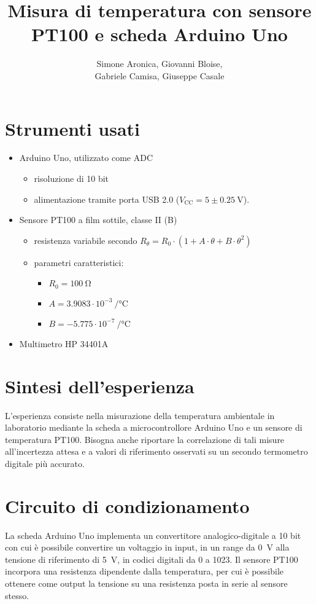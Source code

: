 \documentclass{article}
\title{Misura di temperatura con
sensore PT100 e
scheda Arduino Uno}
\author{Simone Aronica, Giovanni Bloise, \\
Gabriele Camisa, Giuseppe Casale}
\begin{document}
\maketitle
\tableofcontents
\pagebreak

\section{Strumenti usati}
\begin{itemize}
    \item Arduino Uno, utilizzato come ADC 
    \begin{itemize}
        \item risoluzione di 10 bit 
        \item alimentazione tramite porta USB 2.0 ($V_{\text{CC}} = 5 \pm \SI{0.25}{\volt}$).
    \end{itemize}
    \item Sensore PT100 a film sottile, classe II (B) 
    \begin{itemize}
        \item resistenza variabile secondo $R_{\theta}=R_0\cdot\left(1+A\cdot\theta+B\cdot\theta^2\right)$
        \item parametri caratteristici:
        \begin{itemize}
            \item $R_0=\SI{100}{\ohm}$
            \item $A=3.9083\cdot10^{-3}\SI{}{\per\celsius}$
            \item $B=-5.775\cdot10^{-7}\SI{}{\per\celsius}$
        \end{itemize}
    \end{itemize}
    \item Multimetro HP 34401A
\end{itemize}

\section{Sintesi dell'esperienza}
L'esperienza consiste nella misurazione della temperatura ambientale in laboratorio mediante la scheda a microcontrollore Arduino Uno e un sensore di temperatura PT100. Bisogna anche riportare la correlazione di tali misure all'incertezza attesa e a valori di riferimento osservati su un secondo termometro digitale più accurato.

\section{Circuito di condizionamento}
La scheda Arduino Uno implementa un convertitore analogico-digitale a 10 bit con cui è possibile convertire un voltaggio in input, in un range da \SI{0}{\volt} alla tensione di riferimento di \SI{5}{\volt}, in codici digitali da 0 a 1023. 
Il sensore PT100 incorpora una resistenza dipendente dalla temperatura, per cui è possibile ottenere come output la tensione su una resistenza posta in serie al sensore stesso.
\end{document}
